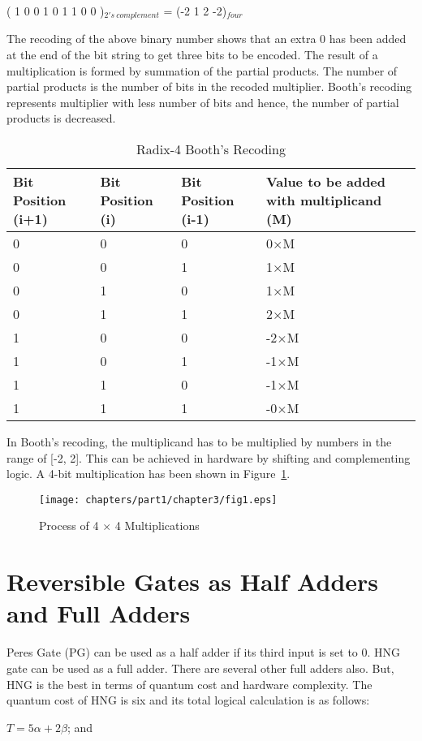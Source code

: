 ( 1 0    0 1   0 1   1 0 {\textbar} 0 )${}_{2's\ complement}$ = (-2 1 2 -2)${}_{four}$

The recoding of the above binary number shows that an extra {0} has been added at the end of the bit string to get three bits to be encoded. The result of a multiplication is formed by summation of the partial products. The number of partial products is the number of bits in the recoded multiplier. Booth's recoding represents multiplier with less number of bits and hence, the number of partial products is decreased.

\begin{table}[!h]
	\centering
	\caption{Radix-4 Booth's Recoding}
	\label{tab:p1_c3_tab1}
	\begin{tabular}{p{0.6in}p{0.6in}p{0.5in}p{0.9in}} \hline  
		\textbf{Bit  Position (i+1)} & \textbf{Bit Position (i)} & \textbf{Bit Position  (i-1)} & \textbf{Value to be added with   multiplicand (M)} \\ \hline 
		0 & 0 & 0 & 0$\times $M \\ 
		0 & 0 & 1 & 1$\times $M \\ 
		0 & 1 & 0 & 1$\times $M \\  
		0 & 1 & 1 & 2$\times $M \\  
		1 & 0 & 0 & -2$\times $M \\ 
		1 & 0 & 1 & -1$\times $M \\  
		1 & 1 & 0 & -1$\times $M \\ 
		1 & 1 & 1 & -0$\times $M \\ \hline 
	\end{tabular}
\end{table}

In Booth's recoding, the multiplicand has to be multiplied by numbers in the range of [-2, 2]. This can be achieved in hardware by shifting and complementing logic. A {4}-bit multiplication has been shown in Figure~\ref{fig:p1_c3_fig1}. 

\begin{figure}[h]
	\centering
	\texttt{[image: chapters/part1/chapter3/fig1.eps]}
	\caption{Process of {4 $\times$ 4} Multiplications}
	\label{fig:p1_c3_fig1}
\end{figure}

\section{Reversible Gates as Half Adders and Full Adders}
Peres Gate (PG) can be used as a half adder if its third input is set to {0}. HNG gate can be used as a full adder. There are several other full adders also. But, HNG is the best in terms of quantum cost and hardware complexity. The quantum cost of HNG is six and its total logical calculation is as follows:
\begin{center}
	$T = 5\alpha + 2\beta$; and
\end{center}

